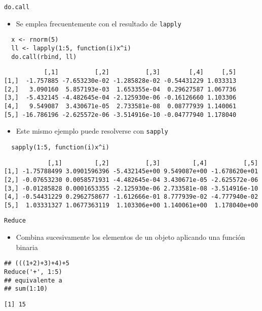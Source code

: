 \documentclass[xcolor={usenames,svgnames,dvipsnames}]{beamer}
\begin{document}
\begin{frame}[fragile,label={sec:orgheadline29}]{\texttt{do.call}}
 \begin{itemize}
\item Se emplea frecuentemente con el resultado de \texttt{lapply}
\end{itemize}
\lstset{language=R,label= ,caption= ,captionpos=b,numbers=none}
\begin{lstlisting}
  x <- rnorm(5)
  ll <- lapply(1:5, function(i)x^i)
  do.call(rbind, ll)
\end{lstlisting}

\begin{verbatim}
           [,1]          [,2]          [,3]        [,4]     [,5]
[1,]  -1.757885 -7.653230e-02 -1.285828e-02 -0.54431229 1.033313
[2,]   3.090160  5.857193e-03  1.653355e-04  0.29627587 1.067736
[3,]  -5.432145 -4.482645e-04 -2.125930e-06 -0.16126660 1.103306
[4,]   9.549087  3.430671e-05  2.733581e-08  0.08777939 1.140061
[5,] -16.786196 -2.625572e-06 -3.514916e-10 -0.04777940 1.178040
\end{verbatim}

\begin{itemize}
\item Este mismo ejemplo puede resolverse con \texttt{sapply}
\end{itemize}
\lstset{language=R,label= ,caption= ,captionpos=b,numbers=none}
\begin{lstlisting}
  sapply(1:5, function(i)x^i)
\end{lstlisting}

\begin{verbatim}
            [,1]         [,2]          [,3]         [,4]          [,5]
[1,] -1.75788499 3.0901596396 -5.432145e+00 9.549087e+00 -1.678620e+01
[2,] -0.07653230 0.0058571931 -4.482645e-04 3.430671e-05 -2.625572e-06
[3,] -0.01285828 0.0001653355 -2.125930e-06 2.733581e-08 -3.514916e-10
[4,] -0.54431229 0.2962758677 -1.612666e-01 8.777939e-02 -4.777940e-02
[5,]  1.03331327 1.0677363119  1.103306e+00 1.140061e+00  1.178040e+00
\end{verbatim}
\end{frame}

\begin{frame}[fragile,label={sec:orgheadline30}]{\texttt{Reduce}}
 \begin{itemize}
\item Combina sucesivamente los elementos de un objeto aplicando una
función binaria
\end{itemize}
\lstset{language=R,label= ,caption= ,captionpos=b,numbers=none}
\begin{lstlisting}
## (((1+2)+3)+4)+5
Reduce('+', 1:5)
## equivalente a 
## sum(1:10)
\end{lstlisting}

\begin{verbatim}
[1] 15
\end{verbatim}
\end{frame}
\end{document}
